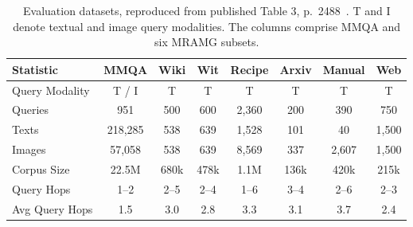 \begin{table}[!htbp]
\centering
\small
\setlength{\tabcolsep}{3pt}
\caption{Evaluation datasets, reproduced from published Table 3, p.~2488~\cite{mgrag-paper}. T and I denote textual and image query modalities. The columns comprise MMQA and six MRAMG subsets.}\label{tab:mgrag:datasets}
\begin{tabular}{lccccccc}
\toprule
Statistic & MMQA & Wiki & Wit & Recipe & Arxiv & Manual & Web\\
\midrule
Query Modality     & T / I       & T             & T            & T               & T              & T               & T             \\
Queries            & 951           & 500           & 600          & 2,360            & 200            & 390             & 750           \\
Texts              & 218,285       & 538           & 639          & 1,528           & 101            & 40              & 1,500         \\
Images             & 57,058        & 538           & 639          & 8,569           & 337            & 2,607           & 1,500         \\
Corpus Size             & 22.5M        & 680k           & 478k          & 1.1M           & 136k            & 420k           & 215k         \\
Query Hops             & 1--2        & 2--5           & 2--4          & 1--6           & 3--4            & 2--6           & 2--3         \\
Avg Query Hops 	   & 1.5           & 3.0           & 2.8          & 3.3             & 3.1            & 3.7             & 2.4           \\
\bottomrule
\end{tabular}
\end{table}
